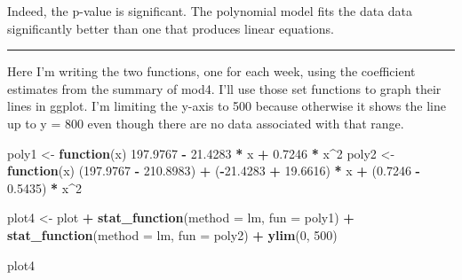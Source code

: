 \documentclass[]{article}
\newenvironment{Shaded}{\begin{snugshade}}{\end{snugshade}}
\newcommand{\KeywordTok}[1]{\textcolor[rgb]{0.13,0.29,0.53}{\textbf{#1}}}
\newcommand{\DataTypeTok}[1]{\textcolor[rgb]{0.13,0.29,0.53}{#1}}
\newcommand{\DecValTok}[1]{\textcolor[rgb]{0.00,0.00,0.81}{#1}}
\newcommand{\FloatTok}[1]{\textcolor[rgb]{0.00,0.00,0.81}{#1}}
\newcommand{\StringTok}[1]{\textcolor[rgb]{0.31,0.60,0.02}{#1}}
\newcommand{\ControlFlowTok}[1]{\textcolor[rgb]{0.13,0.29,0.53}{\textbf{#1}}}
\newcommand{\OperatorTok}[1]{\textcolor[rgb]{0.81,0.36,0.00}{\textbf{#1}}}
\newcommand{\NormalTok}[1]{#1}
\begin{document}
Indeed, the p-value is significant. The polynomial model fits the data
data significantly better than one that produces linear equations.

\begin{center}\rule{0.5\linewidth}{\linethickness}\end{center}

Here I'm writing the two functions, one for each week, using the
coefficient estimates from the summary of mod4. I'll use those set
functions to graph their lines in ggplot. I'm limiting the y-axis to 500
because otherwise it shows the line up to y = 800 even though there are
no data associated with that range.

\begin{Shaded}
\begin{Highlighting}[]
\NormalTok{poly1 <-}\StringTok{ }\ControlFlowTok{function}\NormalTok{(x) }\FloatTok{197.9767} \OperatorTok{-}\StringTok{ }\FloatTok{21.4283} \OperatorTok{*}\StringTok{ }\NormalTok{x }\OperatorTok{+}\StringTok{ }\FloatTok{0.7246} \OperatorTok{*}\StringTok{ }\NormalTok{x}\OperatorTok{^}\DecValTok{2}
\NormalTok{poly2 <-}\StringTok{ }\ControlFlowTok{function}\NormalTok{(x) (}\FloatTok{197.9767} \OperatorTok{-}\StringTok{ }\FloatTok{210.8983}\NormalTok{) }\OperatorTok{+}\StringTok{ }\NormalTok{(}\OperatorTok{-}\FloatTok{21.4283} \OperatorTok{+}\StringTok{ }\FloatTok{19.6616}\NormalTok{) }\OperatorTok{*}\StringTok{ }\NormalTok{x }\OperatorTok{+}\StringTok{ }\NormalTok{(}\FloatTok{0.7246} \OperatorTok{-}\StringTok{ }\FloatTok{0.5435}\NormalTok{) }\OperatorTok{*}\StringTok{ }\NormalTok{x}\OperatorTok{^}\DecValTok{2}
\end{Highlighting}
\end{Shaded}

\begin{Shaded}
\begin{Highlighting}[]
\NormalTok{plot4 <-}\StringTok{ }\NormalTok{plot }\OperatorTok{+}
\StringTok{  }\KeywordTok{stat_function}\NormalTok{(}\DataTypeTok{method =}\NormalTok{ lm, }\DataTypeTok{fun =}\NormalTok{ poly1) }\OperatorTok{+}\StringTok{ }
\StringTok{  }\KeywordTok{stat_function}\NormalTok{(}\DataTypeTok{method =}\NormalTok{ lm, }\DataTypeTok{fun =}\NormalTok{ poly2) }\OperatorTok{+}
\StringTok{  }\KeywordTok{ylim}\NormalTok{(}\DecValTok{0}\NormalTok{, }\DecValTok{500}\NormalTok{)}

\NormalTok{plot4}
\end{Highlighting}
\end{Shaded}
\end{document}

